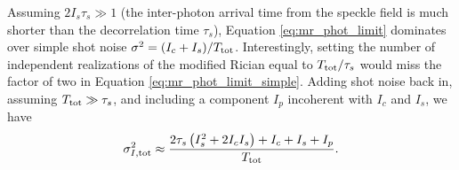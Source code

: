 \documentclass[../main.tex]{subfiles}
\begin{document}
Assuming $2 I_s \tau_s \gg 1$ (the inter-photon arrival time from the speckle field is much shorter than the decorrelation time $\tau_s$), Equation \eqref{eq:mr_phot_limit} dominates over simple shot noise $\sigma^2 = (I_c + I_s)/T_{\rm tot}$.  Interestingly, setting the number of independent realizations of the modified Rician equal to $T_{\rm tot}/\tau_s$ would miss the factor of two in Equation \eqref{eq:mr_phot_limit_simple}.  Adding shot noise back in, assuming $T_{\rm tot} \gg \tau_s$, and including a component $I_p$ incoherent with $I_c$ and $I_s$, we have
\begin{equation}
    \sigma^2_{I, \rm tot} \approx \frac{2\tau_s \left( I_s^2 + 2 I_c I_s \right) + I_c + I_s + I_p}{T_{\rm tot}}.
\end{equation}
\end{document}
